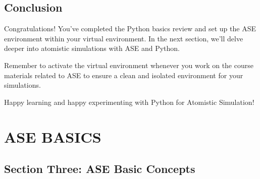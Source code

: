 \documentclass[letterpaper,10pt,english]{sphinxmanual}
\begin{document}
\begin{sphinxVerbatim}[commandchars=\\\{\}]
   

    
  
 
\end{sphinxVerbatim}


\section{Conclusion}
\label{\detokenize{basics/basics:conclusion}}
\sphinxAtStartPar
Congratulations! You’ve completed the Python basics review and set up the ASE environment within your virtual environment. In the next section, we’ll delve deeper into atomistic simulations with ASE and Python.

\sphinxAtStartPar
Remember to activate the virtual environment whenever you work on the course materials related to ASE to ensure a clean and isolated environment for your simulations.

\sphinxAtStartPar
Happy learning and happy experimenting with Python for Atomistic Simulation!

\sphinxstepscope


\chapter{ASE BASICS}
\label{\detokenize{asebasics/asebasics:ase-basics}}\label{\detokenize{asebasics/asebasics::doc}}

\section{Section Three: ASE Basic Concepts}
\label{\detokenize{asebasics/asebasics:section-three-ase-basic-concepts}}
\end{document}
